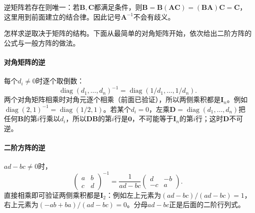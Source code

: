 逆矩阵若存在则唯一：若$\bm B,\bm C$都满足条件，则$\bm B=\bm B(\bm A\bm C)=(\bm B\bm A)\bm C=\bm C$，这里用到前面建立的结合律。因此记号$\bm A^{-1}$不会有歧义。

怎样求逆取决于矩阵的结构。下面从最简单的对角矩阵开始，依次给出二阶方阵的公式与一般方阵的做法。

\paragraph{对角矩阵的逆}
每个$d_i\neq0$时逐个取倒数：
\[
 \operatorname{diag}(d_1,\ldots,d_n)^{-1}=\operatorname{diag}(1/d_1,\ldots,1/d_n).
\]
两个对角矩阵相乘时对角元逐个相乘（前面已验证），所以两侧乘积都是$\bm I_n$。例如$\operatorname{diag}(2,1)^{-1}=\operatorname{diag}(1/2,1)$。若某个$d_i=0$，左乘$\bm D=\operatorname{diag}(d_1,\ldots,d_n)$把任何$\bm B$的第$i$行乘以$d_i$，所以$\bm D\bm B$的第$i$行是$\bm0$，不可能等于$\bm I_n$的第$i$行；这时$\bm D$不可逆。

\paragraph{二阶方阵的逆}
$ad-bc\neq0$时，
\[
 \begin{pmatrix}a&b\\c&d\end{pmatrix}^{-1}=\frac1{ad-bc}\begin{pmatrix}d&-b\\-c&a\end{pmatrix}.
\]
直接相乘即可验证两侧乘积都是$\bm I_2$：例如左上元素为$(ad-bc)/(ad-bc)=1$，右上元素为$(-ab+ba)/(ad-bc)=0$。分母$ad-bc$正是后面的二阶行列式。

